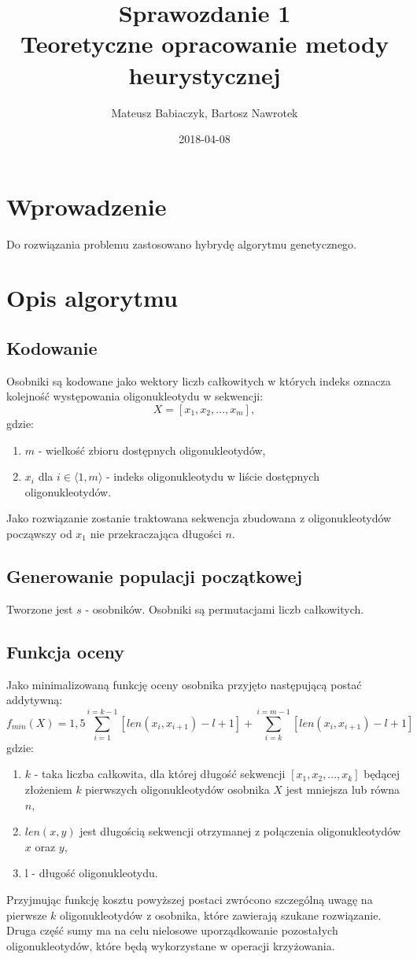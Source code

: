 \documentclass{article}
\title{Sprawozdanie 1 \\ Teoretyczne opracowanie metody heurystycznej}
\date{2018-04-08}
\author{Mateusz Babiaczyk, Bartosz Nawrotek}
\begin{document}
\maketitle
\section{Wprowadzenie}
Do rozwiązania problemu zastosowano hybrydę algorytmu genetycznego.
\section{Opis algorytmu}
\subsection{Kodowanie}
Osobniki są kodowane jako wektory liczb całkowitych w których indeks oznacza kolejność występowania oligonukleotydu w sekwencji:
\begin{equation}
	X = [ x_{1}, x_{2}, \ldots , x_{m}] , 
\end{equation}
gdzie:
\begin{enumerate}
	\item $m$ - wielkość zbioru dostępnych oligonukleotydów,
	\item $x_{i}$ dla $i \in \langle1, m\rangle$ - indeks oligonukleotydu w liście dostępnych oligonukleotydów.
\end{enumerate}
Jako rozwiązanie zostanie traktowana sekwencja zbudowana z oligonukleotydów począwszy od $x_{1}$ nie przekraczająca długości $n$.
\subsection{Generowanie populacji początkowej}
Tworzone jest $s$ - osobników.
Osobniki są permutacjami liczb całkowitych.
\subsection{Funkcja oceny}
Jako minimalizowaną funkcję oceny osobnika przyjęto następującą postać addytywną:
\begin{equation}
	f_{min}(X) = 1,5\sum_{i = 1}^{i = k - 1}{[len(x_{i}, x_{i+1}) - l + 1]} + \sum_{i = k}^{i = m - 1}{[len(x_{i}, x_{i+1})- l + 1]}
\end{equation}
gdzie:
\begin{enumerate}
	\item $k$ - taka liczba całkowita, dla której długość sekwencji $[x_{1}, x_{2}, \ldots , x_{k}]$ będącej złożeniem $k$ pierwszych oligonukleotydów osobnika $X$ jest mniejsza lub równa $n$,
	\item $len(x, y)$ jest długością sekwencji otrzymanej z połączenia oligonukleotydów $x$ oraz $y$,
	\item l - długość oligonukleotydu.
\end{enumerate}
Przyjmując funkcję kosztu powyższej postaci zwrócono szczególną uwagę na pierwsze $k$ oligonukleotydów z osobnika, które zawierają szukane rozwiązanie. Druga część sumy ma na celu nielosowe uporządkowanie pozostałych oligonukleotydów, które będą wykorzystane w operacji krzyżowania.
\pagebreak
\end{document}
